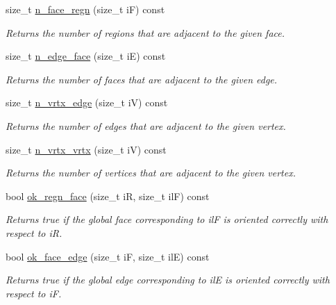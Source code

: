 \begin{DoxyCompactItemize}
size\+\_\+t \hyperlink{classStemMesh3D_1_1mesh__3Dv_a121da582c92b922a0d6ca76a0f1330ee}{n\+\_\+face\+\_\+regn} (size\+\_\+t iF) const
\begin{DoxyCompactList}\small\item\em Returns the number of regions that are adjacent to the given face. \end{DoxyCompactList}\item 
size\+\_\+t \hyperlink{classStemMesh3D_1_1mesh__3Dv_a7655cc55bc89437d85f1a7beddbf66f4}{n\+\_\+edge\+\_\+face} (size\+\_\+t iE) const
\begin{DoxyCompactList}\small\item\em Returns the number of faces that are adjacent to the given edge. \end{DoxyCompactList}\item 
size\+\_\+t \hyperlink{classStemMesh3D_1_1mesh__3Dv_a9996181afbb34b235ef0877471eb4fb3}{n\+\_\+vrtx\+\_\+edge} (size\+\_\+t iV) const
\begin{DoxyCompactList}\small\item\em Returns the number of edges that are adjacent to the given vertex. \end{DoxyCompactList}\item 
size\+\_\+t \hyperlink{classStemMesh3D_1_1mesh__3Dv_a1a6eaa9ed8ebf41ada912b834f34e7c6}{n\+\_\+vrtx\+\_\+vrtx} (size\+\_\+t iV) const
\begin{DoxyCompactList}\small\item\em Returns the number of vertices that are adjacent to the given vertex. \end{DoxyCompactList}\item 
bool \hyperlink{classStemMesh3D_1_1mesh__3Dv_a4c6ab11bf9ea2eac1709052d14f5c5b3}{ok\+\_\+regn\+\_\+face} (size\+\_\+t iR, size\+\_\+t ilF) const
\begin{DoxyCompactList}\small\item\em Returns true if the global face corresponding to ilF is oriented correctly with respect to iR. \end{DoxyCompactList}\item 
bool \hyperlink{classStemMesh3D_1_1mesh__3Dv_af49e94aea3119432fadf9878cafba5c5}{ok\+\_\+face\+\_\+edge} (size\+\_\+t iF, size\+\_\+t ilE) const
\begin{DoxyCompactList}\small\item\em Returns true if the global edge corresponding to ilE is oriented correctly with respect to iF. \end{DoxyCompactList}\item 

\end{DoxyCompactItemize}
